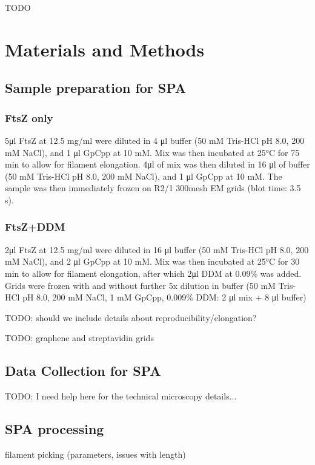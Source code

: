 TODO

\section{Materials and Methods}\label{ftsz_methods}

\subsection{Sample preparation for SPA}

\subsubsection{FtsZ only}
5μl FtsZ at 12.5 mg/ml were diluted in 4 μl buffer (50 mM Tris-HCl pH 8.0, 200 mM NaCl), and 1 μl GpCpp at 10 mM.
Mix was then incubated at 25°C for 75 min to allow for filament elongation.
4μl of mix was then diluted in 16 μl of buffer (50 mM Tris-HCl pH 8.0, 200 mM NaCl), and 1 μl GpCpp at 10 mM.
The sample was then immediately frozen on R2/1 300mesh EM grids (blot time: 3.5 s).

\subsubsection{FtsZ+DDM}
2μl FtsZ at 12.5 mg/ml were diluted in 16 μl buffer (50 mM Tris-HCl pH 8.0, 200 mM NaCl), and 2 μl GpCpp at 10 mM.
Mix was then incubated at 25°C for 30 min to allow for filament elongation, after which 2μl DDM at 0.09\% was added.
Grids were frozen with and without further 5x dilution in buffer (50 mM Tris-HCl pH 8.0, 200 mM NaCl, 1 mM GpCpp, 0.009\% DDM: 2 μl mix + 8 μl buffer)

TODO: should we include details about reproducibility/elongation?

TODO: graphene and streptavidin grids

\subsection{Data Collection for SPA}

TODO: I need help here for the technical microscopy details...

\subsection{SPA processing}

filament picking (parameters, issues with length)

